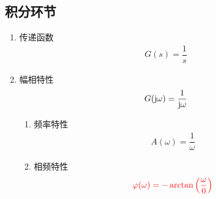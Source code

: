 \subsection{积分环节}
\begin{enumerate}[1.]
	\item 传递函数
	\vspace*{-0.5em}
	\begin{align}
		G(s) = \dfrac{1}{s}
	\end{align}
	\vspace*{-3em}
	
	\item 幅相特性
	\vspace*{-0.5em}
	\begin{align}
		G(\text{j}  \omega) = \dfrac{1}{\text{j} \omega}
	\end{align}
	\vspace*{-3em}
	\begin{enumerate}[(1) ]
		\item 频率特性
		\vspace*{-0.5em}
		\begin{align}
			A(\omega) = \dfrac{1}{\omega}
		\end{align}
		\vspace*{-3em}
		
		\item 相频特性
		\vspace*{-0.5em}
		\begin{align}
			\textcolor{red}{\varphi(\omega) =  -\arctan \left(\dfrac{\omega}{0}\right)}
		\end{align}
		\vspace*{-3em}
		

\end{enumerate}
\end{enumerate}

